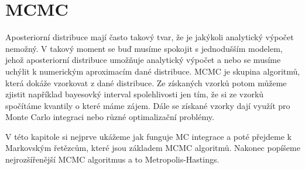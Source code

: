\documentclass[czech,master,public,dept470,male,cpdeclaration,oneside, python]{diploma}
\begin{document}
\section{MCMC}
Aposteriorní distribuce mají často takový tvar, že je jakýkoli analytický výpočet nemožný. V takový moment se buď musíme spokojit s jednodušším modelem, jehož aposteriorní distribuce umožňuje analytický výpočet a nebo se musíme uchýlit k numerickým aproximacím dané distribuce. MCMC je skupina algoritmů, která dokáže vzorkovat z dané distribuce. Ze získaných vzorků potom můžeme zjistit například bayesovký interval spolehlivosti jen tím, že si ze vzorků spočítáme kvantily o které máme zájem. Dále se získané vzorky dají využít pro Monte Carlo integraci nebo různé optimalizační problémy. \par
V této kapitole si nejprve ukážeme jak funguje MC integrace a poté přejdeme k Markovským řetězcům, které jsou základem MCMC algoritmů. Nakonec popíšeme nejrozšířenější MCMC algoritmus a to Metropolis-Hastings.
\end{document}
